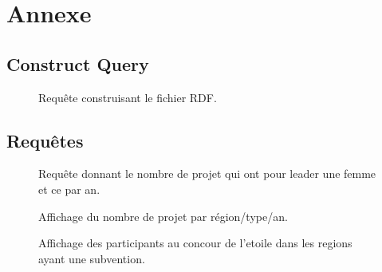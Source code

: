 \chapter{Annexe}
\section{Construct Query}

\begin{figure}[H]

\caption{Requête construisant le fichier RDF.}
\label{1} 
\end{figure}

\section{Requêtes}
\begin{figure}[H]

\caption{Requête donnant le nombre de projet qui ont pour leader une femme et ce par an.}
\label{req1} 
\end{figure}

\begin{figure}[H]

\caption{Affichage du nombre de projet par région/type/an.}
\label{req2} 
\end{figure}

\begin{figure}[H]

\caption{Affichage des participants au concour de l'etoile dans les regions ayant une subvention.}
\label{req3} 
\end{figure}